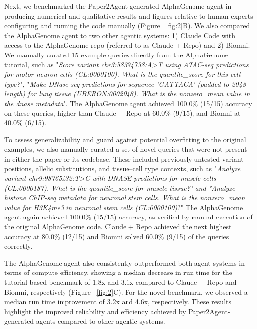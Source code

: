 \documentclass[11pt]{article}
\begin{document}
Next, we benchmarked the Paper2Agent-generated AlphaGenome agent in producing numerical and qualitative results and figures relative to human experts configuring and running the code manually (Figure ~\ref{fig:2}B). We also compared the AlphaGenome agent to two other agentic systems: 1) Claude Code with access to the AlphaGenome repo (referred to as Claude + Repo) and 2) Biomni. We manually curated 15 example queries directly from the AlphaGenome tutorial, such as "\textit{Score variant chr3:58394738:A>T using ATAC-seq predictions for motor neuron cells (CL:0000100). What is the quantile\_score for this cell type?}", "\textit{Make DNase-seq predictions for sequence 'GATTACA' (padded to 2048 length) for lung tissue (UBERON:0002048). What is the nonzero\_mean value in the dnase metadata}". The AlphaGenome agent achieved 100.0\% (15/15) accuracy on these queries, higher than Claude + Repo at 60.0\% (9/15), and Biomni at 40.0\% (6/15). 

To assess generalizability and guard against potential overfitting to the original examples, we also manually curated a set of novel queries that were not present in either the paper or its codebase. These included previously untested variant positions, allelic substitutions, and tissue–cell type contexts, such as "\textit{Analyze variant chr9:98765432:T>C with DNASE predictions for muscle cells (CL:0000187). What is the quantile\_score for muscle tissue?" and "Analyze histone ChIP-seq metadata for neuronal stem cells. What is the nonzero\_mean value for H3K4me3 in neuronal stem cells (CL:0000100)}?" The AlphaGenome agent again achieved 100.0\% (15/15) accuracy, as verified by manual execution of the original AlphaGenome code. Claude + Repo achieved the next highest accuracy at 80.0\% (12/15) and Biomni solved 60.0\% (9/15) of the queries correctly. 

The AlphaGenome agent also consistently outperformed both agent systems in terms of compute efficiency, showing a median decrease in run time for the tutorial-based benchmark of 1.8x and 3.1x compared to Claude + Repo and Biomni, respectively (Figure ~\ref{fig:2}C). For the novel benchmark, we observed a median run time improvement of 3.2x and 4.6x, respectively. These results highlight the improved reliability and efficiency achieved by Paper2Agent-generated agents compared to other agentic systems.
\end{document}
